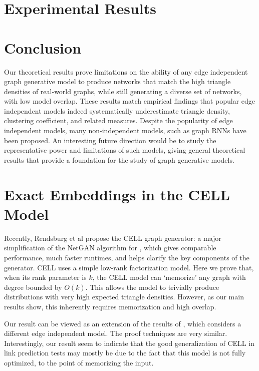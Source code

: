 \documentclass{article}
\begin{document}
\section{Experimental Results}
\label{sec:exp}


\section{Conclusion}
Our theoretical results prove limitations on the ability of any edge independent graph generative model to produce networks that match the high triangle densities of real-world graphs, while still generating a diverse set of networks, with low model overlap. These results match empirical findings that popular edge independent models indeed systematically underestimate triangle density, clustering coefficient, and related measures. Despite the popularity of edge independent models, many non-independent models, such as graph RNNs \cite{YouYingRen:2018} have been proposed. An interesting future direction would be to study the representative power and limitations of such models, giving general theoretical results that provide a foundation for the study of graph generative models.

\clearpage



\clearpage
\appendix

\section{Exact Embeddings in the CELL Model}

Recently, Rendsburg et al \cite{rendsburgnetgan} propose the CELL graph generator: a major simplification of the NetGAN algorithm for \cite{bojchevski2018netgan}, which gives comparable performance, much faster runtimes, and helps clarify the key components of  the generator. CELL uses a simple low-rank factorization model. Here we prove that, when its rank parameter is $k$, the CELL model can `memorize' any graph with degree bounded by $O(k)$. This allows the model to trivially produce distributions with very high expected triangle densities. However, as our main results show, this inherently requires memorization and high overlap. 

Our result can be viewed as an extension of the results of \cite{ChanpuriyaMuscoSotiropoulos:2020}, which considers a different edge independent model. The proof techniques are very similar.
Interestingly, our result seem to indicate that the good generalization of CELL in link prediction tests may mostly be due to the fact that this model is not fully optimized, to the point of memorizing the input. %
%
\end{document}
